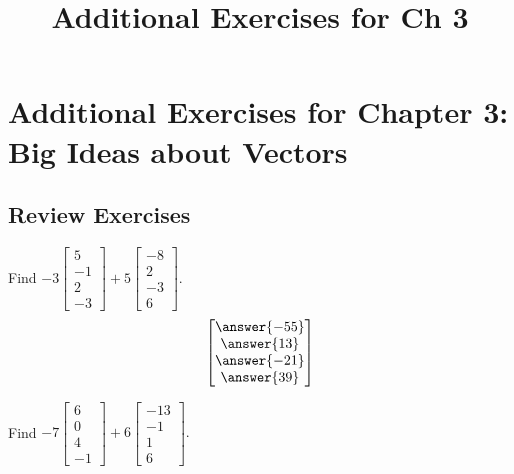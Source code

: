 \documentclass{ximera}
\title{Additional Exercises for Ch 3} \license{CC BY-NC-SA 4.0}
\begin{document}
\begin{abstract}
\end{abstract}
\maketitle

\section*{Additional Exercises for Chapter 3: Big Ideas about Vectors}

\subsection*{Review Exercises}

\begin{problem}\label{prb:3.1} Find $-3
\begin{bmatrix}
5 \\
-1 \\
2 \\
-3
\end{bmatrix}
 +5
\begin{bmatrix}
-8 \\
2 \\
-3 \\
6
\end{bmatrix}.$
$$\begin{bmatrix}
\answer{-55} \\
\answer{13} \\
\answer{-21} \\
\answer{39}
\end{bmatrix}$$
\end{problem}

\begin{problem}\label{prb:3.2} Find $-7
\begin{bmatrix}
6 \\
0 \\
4 \\
-1
\end{bmatrix} +6
\begin{bmatrix}
-13 \\
-1 \\
1 \\
6
\end{bmatrix}.$
\end{problem}
\end{document}
